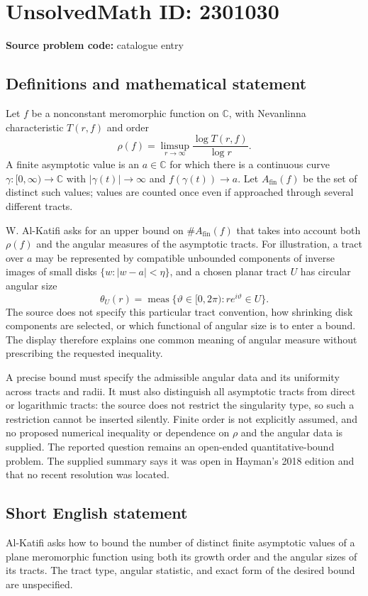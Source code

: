 \documentclass[11pt]{article}
\newcommand{\C}{\mathbb{C}}
\begin{document}
\section*{UnsolvedMath ID: 2301030}
\textbf{Source problem code:} catalogue entry
\subsection{Definitions and mathematical statement}
Let $f$ be a nonconstant meromorphic function on $\C$, with Nevanlinna characteristic $T(r,f)$ and order
\[
\rho(f)=\limsup_{r\to\infty}\frac{\log T(r,f)}{\log r}.
\]
A finite asymptotic value is an $a\in\C$ for which there is a continuous curve $\gamma:[0,\infty)\to\C$ with $|\gamma(t)|\to\infty$ and $f(\gamma(t))\to a$. Let $A_{\mathrm{fin}}(f)$ be the set of distinct such values; values are counted once even if approached through several different tracts.

W. Al-Katifi asks for an upper bound on $\#A_{\mathrm{fin}}(f)$ that takes into account both $\rho(f)$ and the angular measures of the asymptotic tracts. For illustration, a tract over $a$ may be represented by compatible unbounded components of inverse images of small disks $\{w:|w-a|<\eta\}$, and a chosen planar tract $U$ has circular angular size
\[
\theta_U(r)=\operatorname{meas}\{\vartheta\in[0,2\pi):re^{i\vartheta}\in U\}.
\]
The source does not specify this particular tract convention, how shrinking disk components are selected, or which functional of angular size is to enter a bound. The display therefore explains one common meaning of angular measure without prescribing the requested inequality.

A precise bound must specify the admissible angular data and its uniformity across tracts and radii. It must also distinguish all asymptotic tracts from direct or logarithmic tracts: the source does not restrict the singularity type, so such a restriction cannot be inserted silently. Finite order is not explicitly assumed, and no proposed numerical inequality or dependence on $\rho$ and the angular data is supplied. The reported question remains an open-ended quantitative-bound problem. The supplied summary says it was open in Hayman's 2018 edition and that no recent resolution was located.
\subsection{Short English statement}
Al-Katifi asks how to bound the number of distinct finite asymptotic values of a plane meromorphic function using both its growth order and the angular sizes of its tracts. The tract type, angular statistic, and exact form of the desired bound are unspecified.
\end{document}
